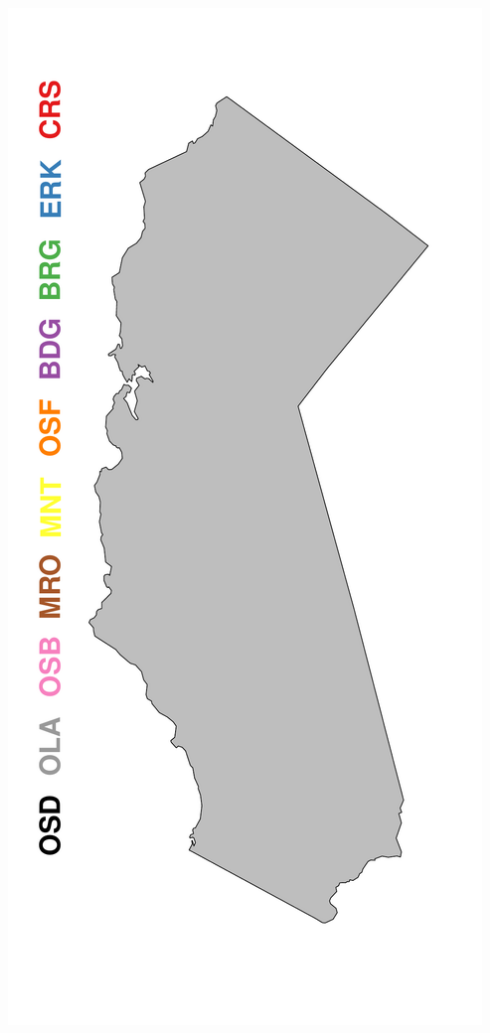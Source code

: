 \documentclass[a0paper,portrait]{baposter}
\begin{document}
\begin{poster}
{\begin{minipage}[h!]{0.19\textwidth}
	        \includegraphics[width=0.94\textwidth]{../pictures/mapFullSparse.pdf}
	\end{minipage}
}


\end{poster}
\end{document}
